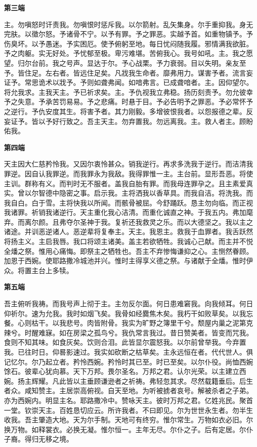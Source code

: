 \documentclass[UTF8,17pt]{ctexart}
\begin{document}
\textbf{第三端}

主。勿嗔怒时讦责我。勿嗔恨时惩斥我。以尔箭射。乱⽮集⾝。尔⼿重抑我。⾝⽆完肤。以徵尔怒。予诸⾻不宁。以予有罪。予之罪恶。实越予⾸。如重物镇予。予伤臭坏。以予愚迷。予实困厄。使予俯躬⾄地。每⽇忧闷随我履。邪情满我欲脏。予之⾁躯。实⽆好处。予忧郁⾄极。卑污难堪。苦俯我⼼。我号如吼。主。我之愿望。归尔台前。我之号声。显达于尔。予⼼战栗。予⼒衰弱。⽬以失明。亲友⾄予。皆住⾜。左右者。皆远住⾜矣。凡戕我⽣命者。靡弗⽤⼒。谋害予者。流⾔妄证予。常思诡术以戕予。予则如聋弗闻。如喑弗⾔。已成聋喑者。主。因仰望尔。将允我求。主我天主。予已祈求矣。主。予仇视我⽴弗稳。扬历刻责予。勿允彼幸予之失意。予承苦罚易易。予之悲痛。时悬于⽬。予必告明予之罪恶。予必常怀予之逆⾏。予仇安度其⽣。将害予者。其⼒刚毅。多增彼恨我者。以怨报德之辈。反妄证予。皆以予好⾏致之。吾主天主。勿弃置我。勿远离我。主。救⼈者主。顾盼佑我。

\textbf{第四端}

天主因⼤仁慈矜怜我。又因尔衷怜甚众。销我逆⾏。再求多洗我于逆⾏。⽽洁清我罪逆。因⾃认我罪逆。⽽我罪永为我敌。我得罪惟⼀主。主台前。显形吾恶。将使主训。群称有义。⽽判时⽆不服者。盖我⾃胎有罪。⽽我母连罪孕之。且主素爱真实。曾以尔智德中隐密之事。启⽰我。主将洒我以⾹草具。⽽我⾃洁。将洗我。⽽我⾃⽩。⽩于雪。主将快我以所闻。⽽骸⾻被屈。今舒踊跃。恳主勿向临。⽽正视我诸罪。祈销我诸逆⾏。天主重化我⼼洁清。⽽重化诚直之神。于我五内。弗加麾弃。⽽离尔颜。且弗夺尔圣神于我。复祈还我救灵之乐。⽽以⼤德坚之。我以主之诸途。并训恶逆诸⼈。恶逆辈将复奉主。天主。我恩主。救我于⾎罪者。我⾆跃然将扬主义。主启我唇。我口将颂主诸美。盖主若欲牺牲。我诚⼼己献。⽽主并不悦全燔之祭。惟⽤⼼痛悔。即祭主之牺牲也。吾主不弃惨悔谦抑之⼼。主恻然眷顾。加恩于西婉。使耶路撒冷城池并兴。惟时主得享义德之祭。与诸献于全燔。惟时伊众。将置主台上多犊。

\textbf{第五端}

吾主俯听我祷。⽽我号声上彻于主。主勿反尔⾯。何⽇患难窘我。向我倾⽿。何日仰祈尔。速为允我。我时如烟飞矣。我⾻如经爨焦木矣。我朽⼲如败草矣。以我忘餐。⼼则枯⼲。以我悲号。⾁皆附⾻。我实为旷野之簿⾥⼲兮。颓屋内巢之泥第克辣兮。时醒难寐。如在房梁之孤鸟兮。我仇常⾔我过。昔⽇赞美者。皆变⽽咒我。⾷则不知其味。如⾷灰矣。饮则合泪。此皆显尔震怒我。以尔前曾举我。今弃置我。已往时⽇。仰晷影速过。我实如砍断之枯草矣。主永远恒在者。代代世⼈。俱记忆尔。尔乃起⽴者。矜怜西婉。矜怜时其已⾄。时已⾄矣。以尔仆役。尚恤西婉馀⽯。彼辈⼼犹向慕。天下万邦。畏尔圣名。万邦之君。认尔光荣。以主建⽴西婉。扬主辉耀。凡此皆以主垂顾谦逊者之祈祷。弗轻忽其求。尽然载籍垂后。后⽣者众。咸知赞主。主居崇⾼俯视。⾃天⾄地。为听被掳者哀号。解被杀者之⼦弟。亦为西婉内。明显主名。耶路撒冷中。赞咏天主。彼时万邦之君。亿姓兆民。聚⾸⼀堂。钦崇天主。百姓恳切应云。所许我者。不⽈即见。尔为世世永⽣者。勿半⽣收我。吾主肇造⼤地。天为尔⼿制。天地可有终穷。惟尔常⽣。万物如⾐必旧。尔换万物。如释裳⾐。必换⽆凝。惟尔恒⼀。主年⽆尽。尔仆之⼦。后有定居。尔仆⼦裔。得归⽆移之境。
\end{document}
